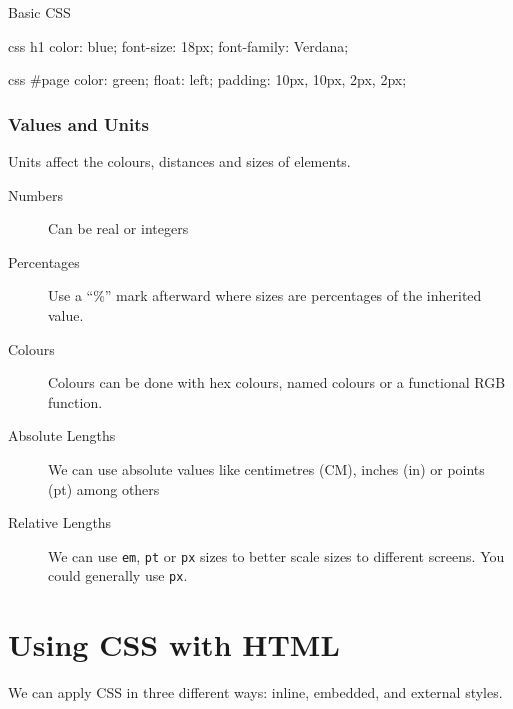 \medskip
\begin{highlight}{Basic CSS}
    \begin{minipage}{0.45\linewidth}
        \begin{code}{css}
            h1 {
                color: blue;
                font-size: 18px;
                font-family: Verdana;
            }
        \end{code}
    \end{minipage}
    \hfill
    \begin{minipage}{0.45\linewidth}
        \begin{code}{css}
            #page {
                color: green;
                float: left;
                padding: 10px, 10px, 2px, 2px;
            }
        \end{code}
    \end{minipage}
\end{highlight}

\subsubsection{Values and Units}\label{ssub:values_and_units}

Units affect the colours, distances and sizes of elements.
\begin{description}
    \item[Numbers] Can be real or integers
    \item[Percentages] Use a ``\%'' mark afterward where sizes are percentages of the inherited value.
    \item[Colours] Colours can be done with hex colours, named colours or a functional RGB function.
    \item[Absolute Lengths] We can use absolute values like centimetres (CM), inches (in) or points (pt) among others
    \item[Relative Lengths] We can use \texttt{em}, \texttt{pt} or \texttt{px} sizes to better scale sizes to different screens.
        You could generally use \texttt{px}.
\end{description}

\section{Using CSS with HTML}\label{sec:using_css_with_html}

We can apply CSS in three different ways: inline, embedded, and external styles.

